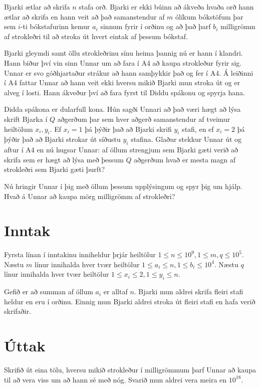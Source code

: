 Bjarki ætlar að skrifa $n$ stafa orð.
Bjarki er ekki búinn að ákveða hvaða orð hann ætlar að skrifa en hann veit að 
það samanstendur af $m$ ólíkum bókstöfum þar sem $i$-ti bókstafurinn kemur $a_i$ 
sinnum fyrir í orðinu og að það þarf $b_i$ milligrömm af strokleðri til að 
stroka út hvert eintak af þessum bókstaf.

Bjarki gleymdi samt öllu strokleðrinu sínu heima þannig nú er hann í klandri. 
Hann biður því vin sinn Unnar um að fara í A4 að kaupa strokleður fyrir sig.
Unnar er svo góðhjartaður strákur að hann samþykkir það og fer í A4.
Á leiðinni í A4 fattar Unnar að hann veit ekki hversu mikið Bjarki mun 
stroka út og er alveg í losti. Hann ákveður því að fara fyrst til
Diddu spákonu og spyrja hana.

Didda spákona er dularfull kona. Hún sagði Unnari að það væri hægt að lýsa 
skrift Bjarka í $Q$ aðgerðum þar sem hver aðgerð samanstendur af tveimur
heiltölum $x_i,y_i$. Ef $x_i = 1$ þá þýðir það að Bjarki skrifi $y_i$ stafi,
en ef $x_i = 2$ þá þýðir það að Bjarki strokar út síðustu $y_i$ stafina.
Glaður stekkur Unnar út og aftur í A4 en nú hugsar Unnar: af öllum strengjum
sem Bjarki gæti verið að skrifa sem er hægt að lýsa með þessum $Q$ aðgerðum 
hvað er mesta magn af strokleðri sem Bjarki gæti þurft?

Nú hringir Unnar í þig með öllum þessum upplýsingum og spyr þig um hjálp.
Hvað á Unnar að kaupa mörg milligrömm af strokleðri?

\section*{Inntak}
Fyrsta línan í inntakinu inniheldur þrjár heiltölur $1 \le n \le 10^9, 1 \le m,q \le 10^5$.
Næstu $m$ línur innihalda hver tvær heiltölur $1 \le a_i \le n, 1 \le b_i \le 10^4$.
Næstu $q$ línur innihalda hver tvær heiltölur $1 \le x_i \le 2, 1 \le y_i \le n$.

Gefið er að summan af öllum $a_i$ er alltaf $n$.
Bjarki mun aldrei skrifa fleiri stafi heldur en eru í orðinu.
Einnig mun Bjarki aldrei stroka út fleiri stafi en hafa verið skrifaðir.

\section*{Úttak}
Skrifið út eina tölu, hversu mikið strokleður í milligrömmum þarf Unnar að kaupa til 
að vera viss um að hann sé með nóg.
Svarið mun aldrei vera meira en $10^{18}$.

